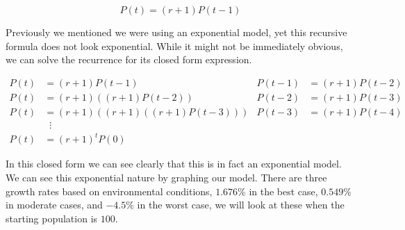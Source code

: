 \documentclass{article}
\begin{document}
\begin{equation} \label{eq:basic-recursive-exponential}
    P(t) = (r+1)P(t-1)
\end{equation}

Previously we mentioned we were using an exponential model, yet this recursive formula does not look exponential. While it might not be immediately obvious, we can solve the recurrence for its closed form expression.

\begin{align*}
    P(t) &= (r+1)P(t-1) & P(t-1) &= (r+1)P(t-2) \\
    P(t) &= (r+1)\left((r+1)P(t-2)\right) & P(t-2) &= (r+1)P(t-3) \\
    P(t) &= (r+1)\left((r+1)\left((r+1)P(t-3)\right)\right) & P(t-3) &= (r+1)P(t-4) \\
    &\phantom{x}\vdots \\
    P(t) &= (r+1)^tP(0)
\end{align*}

In this closed form we can see clearly that this is in fact an exponential model. We can see this exponential nature by graphing our model. There are three growth rates based on environmental conditions, $1.676\%$ in the best case, $0.549\%$ in moderate cases, and $-4.5\%$ in the worst case, we will look at these when the starting population is $100$.
\end{document}
